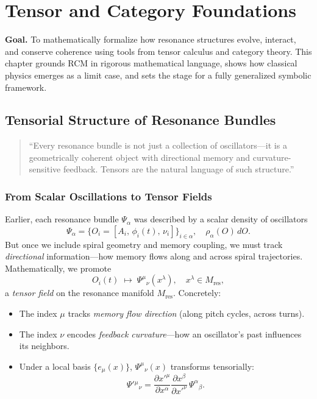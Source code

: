 \chapter{Tensor and Category Foundations}




\begin{concept}
\textbf{Goal.}  
To mathematically formalize how resonance structures evolve, interact, and conserve coherence using tools from tensor calculus and category theory. This chapter grounds RCM in rigorous mathematical language, shows how classical physics emerges as a limit case, and sets the stage for a fully generalized symbolic framework.
\end{concept}

\section{Tensorial Structure of Resonance Bundles}

\begin{quote}
“Every resonance bundle is not just a collection of oscillators—it is a geometrically coherent object with directional memory and curvature-sensitive feedback.  Tensors are the natural language of such structure.”
\end{quote}

\subsection{From Scalar Oscillations to Tensor Fields}

Earlier, each resonance bundle \(\Psi_{\alpha}\) was described by a scalar density of oscillators
\[
  \Psi_{\alpha}
  = \{O_{i} = [A_{i},\,\phi_{i}(t),\,\nu_{i}]\}_{i\in\alpha},\quad
  \rho_{\alpha}(O)\,dO.
\]
But once we include spiral geometry and memory coupling, we must track \emph{directional} information—how memory flows along and across spiral trajectories.  Mathematically, we promote
\[
  O_{i}(t)
  \;\longmapsto\;
  \Psi^{\mu}{}_{\nu}(x^{\lambda}),
  \quad x^{\lambda}\in M_{\mathrm{res}},
\]
a \emph{tensor field} on the resonance manifold \(M_{\mathrm{res}}\).  Concretely:

\begin{itemize}
  \item The index \(\mu\) tracks \emph{memory flow direction} (along pitch cycles, across turns).
  \item The index \(\nu\) encodes \emph{feedback curvature}—how an oscillator’s past influences its neighbors.
  \item Under a local basis \(\{e_{\mu}(x)\}\), \(\Psi^{\mu}{}_{\nu}(x)\) transforms tensorially:
    \[
      \Psi'{}^{\mu}{}_{\nu}
      = \frac{\partial x'^{\mu}}{\partial x^{\alpha}}
        \frac{\partial x^{\beta}}{\partial x'^{\nu}}
        \,\Psi^{\alpha}{}_{\beta}.
    \]
\end{itemize}

